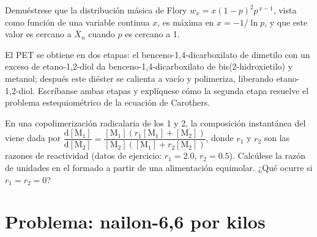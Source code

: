 \begin{exercise}[$\star\star\star$]\label{exo:b2:polymer-synthesis:10}
Demuéstrese que la distribución másica de Flory $w_x = x(1-p)^2p^{\,x-1}$, vista como función de una variable continua
$x$, es máxima en $x = -1/\ln p$, y que este valor es cercano a $\bar X_n$ cuando $p$ es cercano a 1.
\end{exercise}

\begin{exercise}[$\star\star\star$]\label{exo:b2:polymer-synthesis:11}
El PET se obtiene en dos etapas: el benceno-1,4-dicarboxilato de dimetilo con un exceso de etano-1,2-diol da
benceno-1,4-dicarboxilato de bis(2-hidroxietilo) y metanol; después este diéster se calienta a vacío
y polimeriza, liberando etano-1,2-diol. Escríbanse ambas etapas y explíquese cómo la segunda etapa
resuelve el problema estequiométrico de la ecuación de Carothers.
\end{exercise}

\begin{exercise}[$\star\star\star$]\label{exo:b2:polymer-synthesis:12}
En una copolimerización radicalaria de los  1 y 2, la composición instantánea del  viene
dada por $\dfrac{\mathrm d[\mathrm M_1]}{\mathrm d[\mathrm M_2]} = \dfrac{[\mathrm M_1](r_1[\mathrm M_1]
+ [\mathrm M_2])}{[\mathrm M_2]([\mathrm M_1] + r_2[\mathrm M_2])}$, donde $r_1$ y $r_2$ son las
razones de reactividad (datos de ejercicio: $r_1 = 2.0$, $r_2 = 0.5$). Calcúlese la razón de unidades en el
 formado a partir de una alimentación equimolar. ¿Qué ocurre si $r_1 = r_2 = 0$?
\end{exercise}

\section{Problema: nailon-6,6 por kilos}

